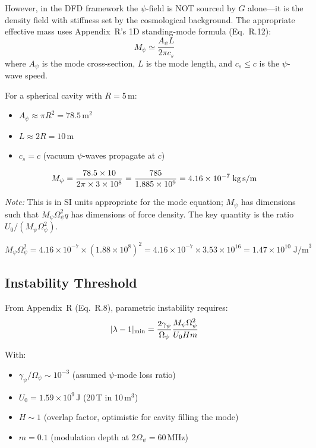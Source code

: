 \documentclass[12pt,letterpaper]{article}
\begin{document}
However, in the DFD framework the $\psi$-field is NOT sourced by $G$ alone---it
is the density field with stiffness set by the cosmological background. The
appropriate effective mass uses Appendix~R's 1D standing-mode formula (Eq.~R.12):
\begin{equation}
M_\psi \simeq \frac{A_\psi L}{2\pi c_s}
\end{equation}
where $A_\psi$ is the mode cross-section, $L$ is the mode length, and
$c_s \leq c$ is the $\psi$-wave speed.

For a spherical cavity with $R = 5$\,m:
\begin{itemize}
\item $A_\psi \approx \pi R^2 = 78.5$\,m$^2$
\item $L \approx 2R = 10$\,m
\item $c_s = c$ (vacuum $\psi$-waves propagate at $c$)
\end{itemize}

\begin{equation}
M_\psi = \frac{78.5 \times 10}{2\pi \times 3 \times 10^8} = \frac{785}{1.885 \times 10^9} = 4.16 \times 10^{-7}\;\text{kg\,s/m}
\end{equation}

\textit{Note:} This is in SI units appropriate for the mode equation; $M_\psi$
has dimensions such that $M_\psi \Omega_\psi^2 q$ has dimensions of force density.
The key quantity is the ratio $U_0/(M_\psi \Omega_\psi^2)$.

\begin{equation}
M_\psi \Omega_\psi^2 = 4.16 \times 10^{-7} \times (1.88 \times 10^8)^2
= 4.16 \times 10^{-7} \times 3.53 \times 10^{16} = 1.47 \times 10^{10}\;\text{J/m}^3
\end{equation}

\subsection{Instability Threshold}

From Appendix~R (Eq.~R.8), parametric instability requires:
\begin{equation}
|\lambda - 1|_{\rm min} = \frac{2\gamma_\psi}{\Omega_\psi} \frac{M_\psi \Omega_\psi^2}{U_0 H m}
\end{equation}

With:
\begin{itemize}
\item $\gamma_\psi / \Omega_\psi \sim 10^{-3}$ (assumed $\psi$-mode loss ratio)
\item $U_0 = 1.59 \times 10^9$\,J (20\,T in 10\,m$^3$)
\item $H \sim 1$ (overlap factor, optimistic for cavity filling the mode)
\item $m = 0.1$ (modulation depth at $2\Omega_\psi = 60$\,MHz)
\end{itemize}
\end{document}
